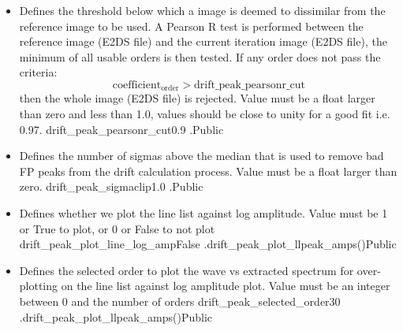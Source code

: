 \begin{itemize}
\item {}
{Defines the threshold below which a image is deemed to dissimilar from the reference image to be used. A Pearson R test is performed between the reference image (E2DS file) and the current iteration image (E2DS file), the minimum of all usable orders is then tested. If any order does not pass the criteria:
\begin{equation}
\text{coefficient}_{\text{order}} > \text{drift\_peak\_pearsonr\_cut}
\end{equation}
then the whole image (E2DS file) is rejected. Value must be a float larger than zero and less than 1.0, values should be close to unity for a good fit i.e. 0.97.
}
{drift\_peak\_pearsonr\_cut}{0.9}
{\calDRIFTPEAK}{\constantsfile}{\calDRIFTPEAK.\progMAIN}{Public}

\item {}
{Defines the number of sigmas above the median that is used to remove bad FP peaks from the drift calculation process. Value must be a float larger than zero.}
{drift\_peak\_sigmaclip}{1.0}
{\calDRIFTPEAK}{\constantsfile}{\calDRIFTPEAK.\progMAIN}{Public}


\item {}
{Defines whether we plot the line list against log amplitude. Value must be 1 or True to plot, or 0 or False to not plot}
{drift\_peak\_plot\_line\_log\_amp}{False}
{\calDRIFTPEAK}{\constantsfile}{\spirouPlot.drift\_peak\_plot{\hskip 0pt}\_llpeak\_amps()}{Public}

\item {}
{Defines the selected order to plot the wave vs extracted spectrum for over-plotting on the line list against log amplitude plot. Value must be an integer between 0 and the number of orders}
{drift\_peak\_selected\_order}{30}
{\calDRIFTPEAK}{\constantsfile}{\spirouPlot.drift\_peak\_plot{\hskip 0pt}\_llpeak\_amps()}{Public}



\end{itemize}





